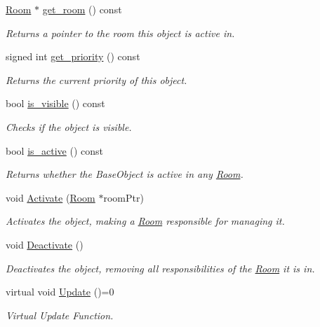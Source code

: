 \begin{DoxyCompactItemize}
\item 
\hyperlink{classhelios_1_1_room}{Room} $\ast$ \hyperlink{classhelios_1_1_base_obj_a80f8b7b016a797e12e54bd76300648ca}{get\+\_\+room} () const 
\begin{DoxyCompactList}\small\item\em Returns a pointer to the room this object is active in. \end{DoxyCompactList}\item 
signed int \hyperlink{classhelios_1_1_base_obj_abc6c07bdfebdea51f75277f6d5409d3e}{get\+\_\+priority} () const 
\begin{DoxyCompactList}\small\item\em Returns the current priority of this object. \end{DoxyCompactList}\item 
bool \hyperlink{classhelios_1_1_base_obj_a3aa6d4c78bbd57109930b5af41a48bc7}{is\+\_\+visible} () const 
\begin{DoxyCompactList}\small\item\em Checks if the object is visible. \end{DoxyCompactList}\item 
bool \hyperlink{classhelios_1_1_base_obj_a4f9a27f7f395e5e0cee2e53751e3b81c}{is\+\_\+active} () const 
\begin{DoxyCompactList}\small\item\em Returns whether the Base\+Object is active in any \hyperlink{classhelios_1_1_room}{Room}. \end{DoxyCompactList}\item 
void \hyperlink{classhelios_1_1_base_obj_aa5f34b01a4ec137038b98434538e19a5}{Activate} (\hyperlink{classhelios_1_1_room}{Room} $\ast$room\+Ptr)
\begin{DoxyCompactList}\small\item\em Activates the object, making a \hyperlink{classhelios_1_1_room}{Room} responsible for managing it. \end{DoxyCompactList}\item 
void \hyperlink{classhelios_1_1_base_obj_ae820f0663d142d5a3c2b248fa4764be4}{Deactivate} ()
\begin{DoxyCompactList}\small\item\em Deactivates the object, removing all responsibilities of the \hyperlink{classhelios_1_1_room}{Room} it is in. \end{DoxyCompactList}\item 
virtual void \hyperlink{classhelios_1_1_base_obj_ac5f5d55ab4be3727bc42e583f20f2ff2}{Update} ()=0
\begin{DoxyCompactList}\small\item\em Virtual Update Function. \end{DoxyCompactList}\end{DoxyCompactItemize}

